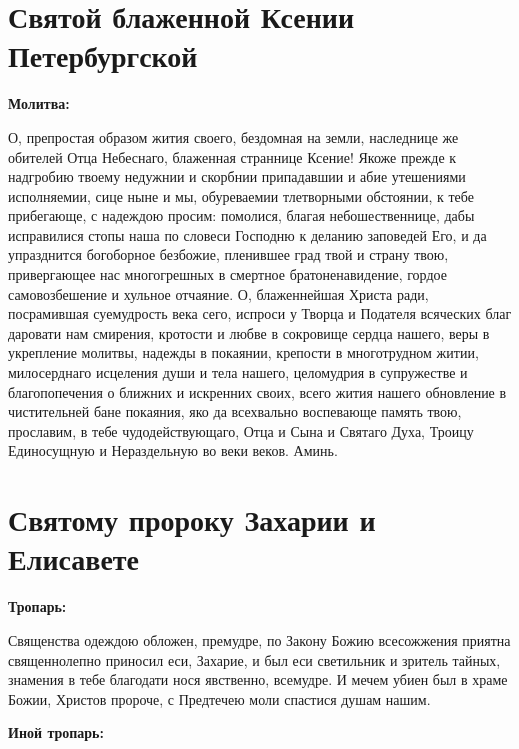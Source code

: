 \section{Святой блаженной Ксении Петербургской}
 
\bfseries Молитва:\normalfont{}


О, препростая образом жития своего, бездомная на земли, наследнице же обителей Отца Небеснаго, блаженная страннице Ксение! Якоже прежде к надгробию твоему недужнии и скорбнии припадавшии и абие утешениями исполняемии, сице ныне и мы, обуреваемии тлетворными обстоянии, к тебе прибегающе, с надеждою просим: помолися, благая небошественнице, дабы исправилися стопы наша по словеси Господню к деланию заповедей Его, и да упразднится богоборное безбожие, пленившее град твой и страну твою, привергающее нас многогрешных в смертное братоненавидение, гордое самовозбешение и хульное отчаяние. О, блаженнейшая Христа ради, посрамившая суемудрость века сего, испроси у Творца и Подателя всяческих благ даровати нам смирения, кротости и любве в сокровище сердца нашего, веры в укрепление молитвы, надежды в покаянии, крепости в многотрудном житии, милосерднаго исцеления души и тела нашего, целомудрия в супружестве и благопопечения о ближних и искренних своих, всего жития нашего обновление в чистительней бане покаяния, яко да всехвально воспевающе память твою, прославим, в тебе чудодействующаго, Отца и Сына и Святаго Духа, Троицу Единосущную и Нераздельную во веки веков. Аминь.\mychapterending


 

\section{Святому пророку Захарии и Елисавете}
 
\bfseries Тропарь:\normalfont{}\nopagebreak


Священства одеждою обложен, премудре, по Закону Божию всесожжения приятна священнолепно приносил еси, Захарие, и был еси светильник и зритель тайных, знамения в тебе благодати нося явственно, всемудре. И мечем убиен был в храме Божии, Христов пророче, с Предтечею моли спастися душам нашим.


\medskip
\bfseries Иной тропарь:\normalfont{}\nopagebreak



